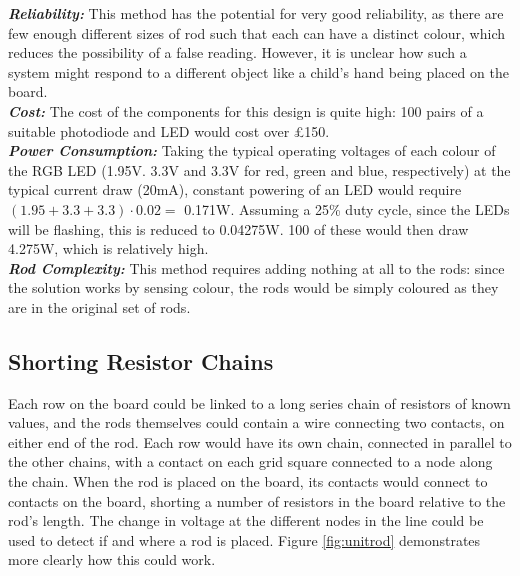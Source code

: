 {
\setlength{\parindent}{0pt} 

\textbf{\textit{Reliability:}} This method has the potential for very good reliability, as there are few enough different sizes of rod such that each can have a distinct colour, which reduces the possibility of a false reading. However, it is unclear how such a system might respond to a different object like a child's hand being placed on the board. \\

\textbf{\textit{Cost:}} The cost of the components for this design is quite high: 100 pairs of a suitable photodiode \cite{KPS5130P52:online} and LED \cite{L154A4SU86:online} would cost over £150.  \\

\textbf{\textit{Power Consumption:}} Taking the typical operating voltages of each colour of the RGB LED (1.95V. 3.3V and 3.3V for red, green and blue, respectively) at the typical current draw (20mA), constant powering of an LED would require $(1.95 + 3.3 + 3.3) \cdot 0.02 =$ 0.171W. Assuming a 25\% duty cycle, since the LEDs will be flashing, this is reduced to 0.04275W. 100 of these would then draw 4.275W, which is relatively high.\\

\textbf{\textit{Rod Complexity:}} This method requires adding nothing at all to the rods: since the solution works by sensing colour, the rods would be simply coloured as they are in the original set of rods.\\
}


\subsection{Shorting Resistor Chains}
\label{resistors}

Each row on the board could be linked to a long series chain of resistors of known values, and the rods themselves could contain a wire connecting two contacts, on either end of the rod. Each row would have its own chain, connected in parallel to the other chains, with a contact on each grid square connected to a node along the chain. When the rod is placed on the board, its contacts would connect to contacts on the board, shorting a number of resistors in the board relative to the rod's length. The change in voltage at the different nodes in the line could be used to detect if and where a rod is placed. Figure \ref{fig:unitrod} demonstrates more clearly how this could work.\\

